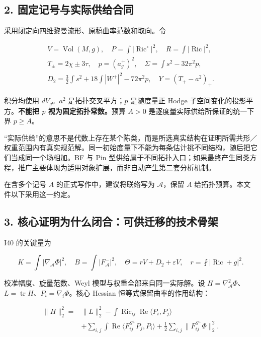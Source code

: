 \documentclass[UTF8,a4paper,11pt,fontset=fandol]{ctexart}
\begin{document}
\subsection{2.
固定记号与实际供给合同}\label{ux56faux5b9aux8bb0ux53f7ux4e0eux5b9eux9645ux4f9bux7ed9ux5408ux540c}

采用闭定向四维黎曼流形、原稿曲率范数和取向。令

\[
\begin{gathered}
V=\operatorname{Vol}(M,g),\quad
P=\int|\operatorname{Ric}^{\circ}|^2,\quad R=\int|\operatorname{Ric}|^2,\\
T_\pm=2\chi\pm3\tau,\quad p=(a_g^+)^2,\quad
\Sigma=\int s^2-32\pi^2p,\\
D_2=\frac32\int s^2+18\int|W^+|^2-72\pi^2p,
\quad Y=(T_+-a^2)_+.
\end{gathered}
\]

积分均使用 \(dV_g\)。\(a^2\) 是拓扑交叉平方；\(p\) 是随度量正 Hodge
子空间变化的投影平方。\textbf{不能把 \(p\) 视为固定拓扑常数。}预算
\(A>0\) 是逐度量实际供给所保证的统一下界 \(p\ge A\)。

``实际供给''的意思不是代数上存在某个陈类，而是所选真实结构在证明所需共形／权重范围内有真实规范解。同一初始度量下不能为每条估计挑不同结构，随后把它们当成同一个场相加。BF
与 Pin
型供给属于不同拓扑入口；如果最终产生同类方程，推广主要体现为适用对象扩展，而非自动产生第二套分析机制。

在含多个记号 \(A\) 的正式写作中，建议将联络写为 \(\mathcal A\)，保留
\(A\) 给拓扑预算。本文件以下采用这一约定。

\subsection{3.
核心证明为什么闭合：可供迁移的技术骨架}\label{ux6838ux5fc3ux8bc1ux660eux4e3aux4ec0ux4e48ux95edux5408ux53efux4f9bux8fc1ux79fbux7684ux6280ux672fux9aa8ux67b6}

I40 的关键量为

\[
K=\int|\nabla_{\mathcal A}\Phi|^2,\quad
B=\int|F_{\mathcal A}^-|^2,\quad
\Theta=rV+D_2+\varepsilon V,
\quad r=\fint|\operatorname{Ric}+g|^2.
\]

校准幅度、旋量范数、Weyl 模型与权重全部来自同一实际解。设
\(H=\nabla_{\mathcal A}^2\Phi\)、\(L=\operatorname{tr}H\)、\(P_i=\nabla_i\Phi\)。核心
Hessian 恒等式保留曲率的作用结构：

\[
\begin{aligned}
\|H\|_2^2={}&\|L\|_2^2
-\int\operatorname{Ric}_{ij}\operatorname{Re}\langle P_i,P_j\rangle\\
&+\sum_{i,j}\int\operatorname{Re}\langle F^{S^+}_{ij}P_j,P_i\rangle
+\frac12\sum_{i,j}\|F^{S^+}_{ij}\Phi\|_2^2.
\end{aligned}
\tag{M1}
\]
\end{document}
